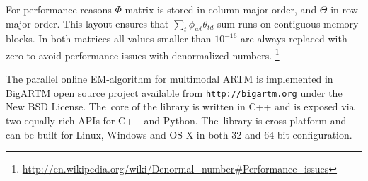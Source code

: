 \documentclass{acm_proc_article-sp}
\begin{document}
For performance reasons $\Phi$ matrix is stored in column-major order, and $\Theta$ in row-major order.
This layout ensures that $\sum_t \phi_{wt} \theta_{td}$ sum runs on contiguous memory blocks.
In both matrices all values smaller than $10^{-16}$ are always replaced with zero to avoid performance issues with denormalized numbers.%
\footnote{\url{http://en.wikipedia.org/wiki/Denormal_number#Performance_issues}}

The parallel online EM-algorithm for multimodal ARTM is implemented in
BigARTM open source project available from \texttt{http://bigartm.org}
under the New BSD License.
The~core of the library is written in C++ and is exposed via two equally rich APIs for C++ and Python.
The~library is cross-platform and can be built for Linux, Windows and OS X in both 32 and 64 bit configuration.
\end{document}
